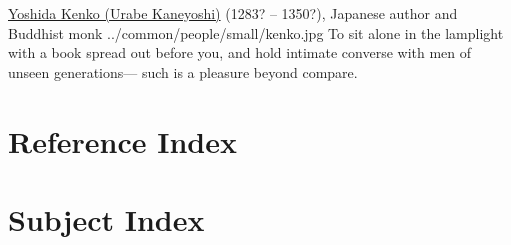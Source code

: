 \qboxnps
  {
    \href{http://en.wikipedia.org/wiki/Yoshida_Kenko}{Yoshida Kenko (Urabe Kaneyoshi)}
    (1283? -- 1350?),
    Japanese author and Buddhist monk
      
      
    \footnotemark
  }
  {../common/people/small/kenko.jpg}
  {To sit alone in the lamplight with a book spread out before you,
   and hold intimate converse with men of unseen generations---
   such is a pleasure beyond compare.}




\chapter*{Reference Index}
\begin{multicols}{3}

\end{multicols}

\chapter*{Subject Index}
\begin{multicols}{3}
  
\end{multicols}

